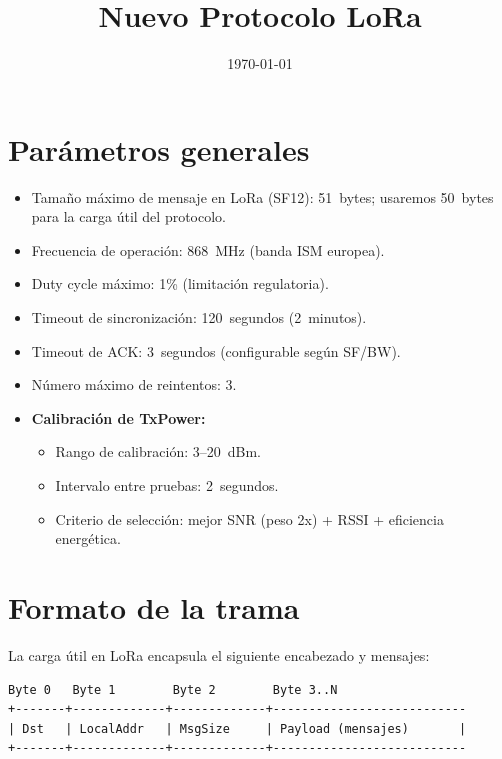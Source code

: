 \documentclass[11pt,a4paper]{article}
\title{Nuevo Protocolo LoRa}
\author{}
\date{\today}
\begin{document}
\maketitle
\onehalfspacing

\section{Parámetros generales}
\begin{itemize}
  \item Tamaño máximo de mensaje en LoRa (SF12): 51~bytes; usaremos 50~bytes para la carga útil del protocolo.
  \item Frecuencia de operación: 868~MHz (banda ISM europea).
  \item Duty cycle máximo: 1\% (limitación regulatoria).
  \item Timeout de sincronización: 120~segundos (2~minutos).
  \item Timeout de ACK: 3~segundos (configurable según SF/BW).
  \item Número máximo de reintentos: 3.
  \item \textbf{Calibración de TxPower:}
    \begin{itemize}
      \item Rango de calibración: 3--20~dBm.
      \item Intervalo entre pruebas: 2~segundos.
      \item Criterio de selección: mejor SNR (peso 2x) + RSSI + eficiencia energética.
    \end{itemize}
\end{itemize}

\section{Formato de la trama}
La carga útil en LoRa encapsula el siguiente encabezado y mensajes:

\begin{verbatim}
Byte 0   Byte 1        Byte 2        Byte 3..N
+-------+-------------+-------------+---------------------------
| Dst   | LocalAddr   | MsgSize     | Payload (mensajes)       |
+-------+-------------+-------------+---------------------------
\end{verbatim}
\end{document}
